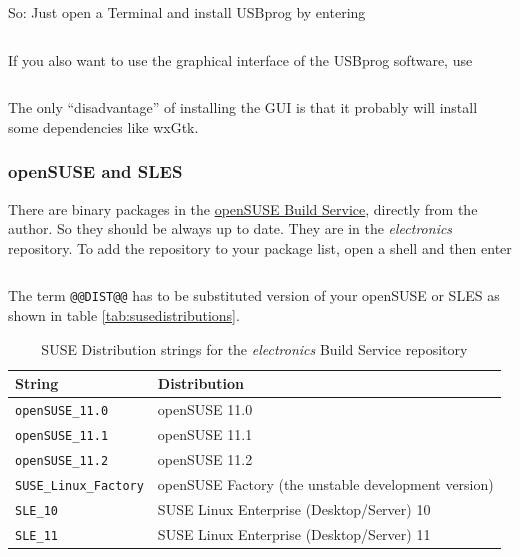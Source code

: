\documentclass[bibtotoc,UKenglish,halfparskip,oneside,DIV12]{scrreprt}
\begin{document}
So: Just open a Terminal and install USBprog by entering

\begin{lstlisting}[style=inline]
% sudo aptitude install usbprog
\end{lstlisting}

If you also want to use the graphical interface of the USBprog software, use

\begin{lstlisting}[style=inline]
% sudo aptitude install usbprog usbprog-gui
\end{lstlisting}

The only ``disadvantage'' of installing the GUI is that it probably will install some dependencies
like wxGtk.

\subsubsection{openSUSE and SLES}

There are binary packages in the \href{https://build.opensuse.org/}{openSUSE Build Service},
directly from the author. So they should be always up to date. They are in the \emph{electronics}
repository. To add the repository to your package list, open a shell and then enter

\begin{lstlisting}[style=inline]
% sudo zypper ar -r http://repos.opensuse.org/electronics/@@DIST@@/electronics.repo
\end{lstlisting}

The term \texttt{@@DIST@@} has to be substituted version of your openSUSE or SLES as shown in table
\vref{tab:susedistributions}.

\begin{table}[h]
  \centering
  \begin{tabular}{|p{4cm}p{10cm}|}
    \hline
    \textbf{String}                 & \textbf{Distribution}                               \\
    \hline
    \hline
    \texttt{openSUSE\_11.0}         & openSUSE 11.0                                       \\
    \texttt{openSUSE\_11.1}         & openSUSE 11.1                                       \\
    \texttt{openSUSE\_11.2}         & openSUSE 11.2                                       \\
    \texttt{SUSE\_Linux\_Factory}   & openSUSE Factory (the unstable development version) \\
    \texttt{SLE\_10}                & SUSE Linux Enterprise (Desktop/Server) 10           \\
    \texttt{SLE\_11}                & SUSE Linux Enterprise (Desktop/Server) 11           \\
    \hline
  \end{tabular}
  \caption{SUSE Distribution strings for the \emph{electronics} Build Service repository}
  \label{tab:susedistributions}
\end{table}
\end{document}
